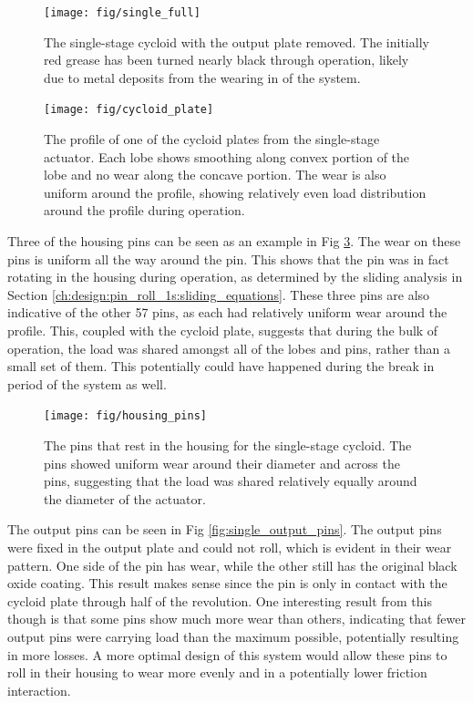 \begin{figure}[h]
   \centering
   \texttt{[image: fig/single\_full]}
   \caption{The single-stage cycloid with the output plate removed. The initially red grease has been turned nearly black through operation, likely due to metal deposits from the wearing in of the system.}
   \label{fig:single_full}
\end{figure}

\begin{figure}[h]
   \centering
   \texttt{[image: fig/cycloid\_plate]}
   \caption{The profile of one of the cycloid plates from the single-stage actuator. Each lobe shows smoothing along convex portion of the lobe and no wear along the concave portion. The wear is also uniform around the profile, showing relatively even load distribution around the profile during operation.}
   \label{fig:cycloid_plate}
\end{figure}


Three of the housing pins can be seen as an example in Fig \ref{fig:single_housing_pins}. The wear on these pins is uniform all the way around the pin. This shows that the pin was in fact rotating in the housing during operation, as determined by the sliding analysis in Section \ref{ch:design:pin_roll_1s:sliding_equations}. These three pins are also indicative of the other 57 pins, as each had relatively uniform wear around the profile. This, coupled with the cycloid plate, suggests that during the bulk of operation, the load was shared amongst all of the lobes and pins, rather than a small set of them. This potentially could have happened during the break in period of the system as well. 

\begin{figure}[h]
   \centering
   \texttt{[image: fig/housing\_pins]}
   \caption{The pins that rest in the housing for the single-stage cycloid. The pins showed uniform wear around their diameter and across the pins, suggesting that the load was shared relatively equally around the diameter of the actuator.}
   \label{fig:single_housing_pins}
\end{figure}


The output pins can be seen in Fig \ref{fig:single_output_pins}. The output pins were fixed in the output plate and could not roll, which is evident in their wear pattern. One side of the pin has wear, while the other still has the original black oxide coating. This result makes sense since the pin is only in contact with the cycloid plate through half of the revolution. One interesting result from this though is that some pins show much more wear than others, indicating that fewer output pins were carrying load than the maximum possible, potentially resulting in more losses. A more optimal design of this system would allow these pins to roll in their housing to wear more evenly and in a potentially lower friction interaction. 

